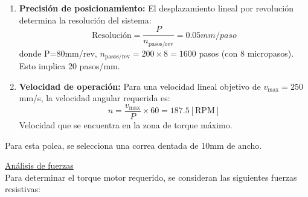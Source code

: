 \begin{enumerate}
    \item \textbf{Precisión de posicionamiento:} El desplazamiento lineal por revolución determina la resolución del sistema:
    \begin{equation}
    \text{Resolución} = \frac{P}{n_{\text{pasos/rev}}} = 0.05mm/paso
    \end{equation}
    donde P=80mm/rev, $n_{\text{pasos/rev}} = 200 \times 8 = 1600$ pasos (con 8 micropasos). Esto implica 20 pasos/mm.
    \item \textbf{Velocidad de operación:} Para una velocidad lineal objetivo de $v_{\text{max}} = 250$\,mm/s, la velocidad angular requerida es:
    \begin{equation}
    n = \frac{v_{\text{max}}}{P} \times 60 = 187.5 [\text{RPM}] 
    \end{equation}
    Velocidad que se encuentra en la zona de torque máximo.
\end{enumerate}
Para esta polea, se selecciona una correa dentada de 10mm de ancho.

\underline{Análisis de fuerzas} \\
Para determinar el torque motor requerido, se consideran las siguientes fuerzas resistivas:

